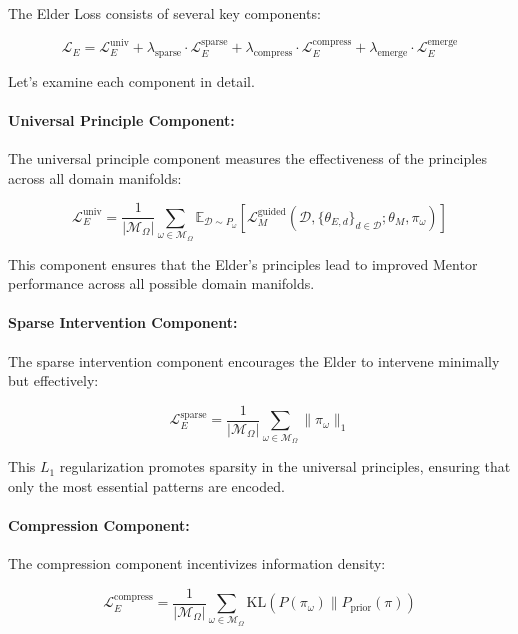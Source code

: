 The Elder Loss consists of several key components:

\begin{equation}
\mathcal{L}_E = \mathcal{L}_E^{\text{univ}} + \lambda_{\text{sparse}} \cdot \mathcal{L}_E^{\text{sparse}} + \lambda_{\text{compress}} \cdot \mathcal{L}_E^{\text{compress}} + \lambda_{\text{emerge}} \cdot \mathcal{L}_E^{\text{emerge}}
\end{equation}

Let's examine each component in detail.

\paragraph{Universal Principle Component:}
The universal principle component measures the effectiveness of the principles across all domain manifolds:

\begin{equation}
\mathcal{L}_E^{\text{univ}} = \frac{1}{|\mathcal{M}_{\Omega}|} \sum_{\omega \in \mathcal{M}_{\Omega}} \mathbb{E}_{\mathcal{D} \sim P_{\omega}} [\mathcal{L}_{M}^{\text{guided}}(\mathcal{D}, \{\theta_{E,d}\}_{d \in \mathcal{D}}; \theta_M, \pi_{\omega})]
\end{equation}

This component ensures that the Elder's principles lead to improved Mentor performance across all possible domain manifolds.

\paragraph{Sparse Intervention Component:}
The sparse intervention component encourages the Elder to intervene minimally but effectively:

\begin{equation}
\mathcal{L}_E^{\text{sparse}} = \frac{1}{|\mathcal{M}_{\Omega}|} \sum_{\omega \in \mathcal{M}_{\Omega}} \|\pi_{\omega}\|_1
\end{equation}

This $L_1$ regularization promotes sparsity in the universal principles, ensuring that only the most essential patterns are encoded.

\paragraph{Compression Component:}
The compression component incentivizes information density:

\begin{equation}
\mathcal{L}_E^{\text{compress}} = \frac{1}{|\mathcal{M}_{\Omega}|} \sum_{\omega \in \mathcal{M}_{\Omega}} \text{KL}(P(\pi_{\omega}) \| P_{\text{prior}}(\pi))
\end{equation}


